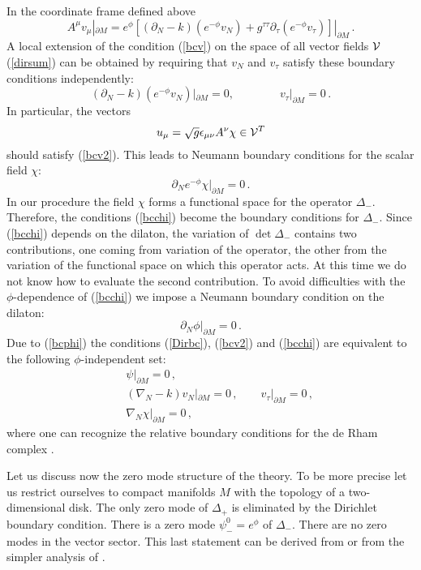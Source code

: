 \documentclass[a4paper,12pt]{article}
\newcommand{\oB}{|_{\partial M}}
\begin{document}
In the coordinate frame defined above
\begin{equation}
A^\mu v_\mu \oB = e^\phi \left[ (\partial_N -k)(e^{-\phi}v_N)
+g^{\tau\tau}\partial_\tau (e^{-\phi }v_\tau )\right]\oB \,.\label{1712}
\end{equation}
A local extension of the condition (\ref{bcv}) on the space of
all vector fields ${\cal V}$ (\ref{dirsum}) can be obtained
by requiring that $v_N$ and $v_\tau$ satisfy these boundary
conditions independently:
\begin{equation}
(\partial_N -k)(e^{-\phi}v_N )\oB =0,\qquad\qquad
v_\tau \oB =0\,.
\label{bcv2}
\end{equation}
In particular, the vectors 
\begin{equation}
u_\mu =\sqrt{g}\epsilon_{\mu\nu}A^\nu \chi \in {\cal V}^T
\end{equation}
should satisfy (\ref{bcv2}). This leads to Neumann boundary
conditions for the scalar field $\chi$:
\begin{equation}
\partial_N e^{-\phi} \chi \oB =0 \,. \label{bcchi}
\end{equation}
In our procedure the field $\chi$ forms a functional space
for the operator $\Delta_-$. Therefore, the conditions (\ref{bcchi})
become the boundary conditions for $\Delta_-$. Since (\ref{bcchi})
depends on the dilaton, the variation of $\det \Delta_-$ contains
two contributions, one coming from variation of the operator,
the other from the variation of the functional space on which this
operator acts. At this time we do not know how to evaluate
the second contribution. To avoid difficulties with the 
$\phi$-dependence of (\ref{bcchi}) we impose a Neumann boundary
condition on the dilaton:
\begin{equation}
\partial_N\phi \oB =0 \,.\label{bcphi}
\end{equation}
Due to (\ref{bcphi}) the conditions (\ref{Dirbc}), (\ref{bcv2})
and (\ref{bcchi}) are equivalent to the following
$\phi$-independent set:
\begin{eqnarray}
&&\psi \oB =0 \,, \nonumber \\
&&(\nabla_N-k)v_N\oB =0\,,\qquad v_\tau \oB =0 \,,
\nonumber \\
&&\nabla_N\chi \oB =0 \,,\label{relbc}
\end{eqnarray}
where one can recognize the relative boundary conditions for
the de Rham complex \cite{Gilkey95}.

Let us discuss now the zero mode structure of the theory.
To be more precise let us restrict ourselves to compact manifolds
$M$ with the topology of a two-dimensional disk. The only
zero mode of $\Delta_+$ is eliminated by the Dirichlet boundary
condition. There is a zero mode $\psi_-^0=e^{\phi}$ of
$\Delta_-$. There are no zero modes in the vector sector.
This last statement can be derived from \cite{Gilkey95} or
from the simpler analysis of \cite{Vassilevich:1995we}.
\end{document}
